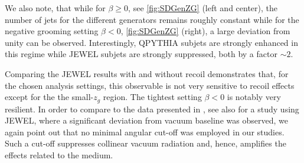 We also note, that while for $\beta \geq 0$, see \autoref{fig:SDGenZG} (left and center), the number of jets for the different generators remains roughly constant while for the negative grooming setting $\beta < 0$, \autoref{fig:SDGenZG} (right), a large deviation from unity can be observed. Interestingly, QPYTHIA subjets are strongly enhanced in this regime while JEWEL subjets are strongly suppressed, both by a factor $\sim2$.

Comparing the JEWEL results with and without recoil demonstrates that, for the chosen analysis settings, this observable is not very sensitive to recoil effects except for the the small-$z_g$ region. The tightest setting $\beta < 0$ is notably very resilient. In order to compare to the data presented in \cite{Sirunyan:2017bsd}, see also \cite{Milhano:2017nzm} for a study using JEWEL, where a significant deviation from vacuum baseline was observed, we again point out that no minimal angular cut-off was employed in our studies. Such a cut-off suppresses collinear vacuum radiation and, hence, amplifies the effects related to the medium.

